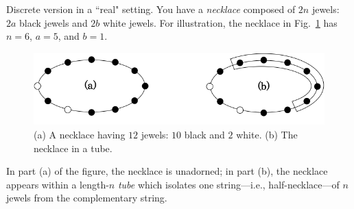 \begin{enumerate}
{\small\sf Discrete version in a ``real" setting}.
You have a {\it necklace} composed of $2n$ jewels: $2a$ black jewels and $2b$ white jewels.  For illustration, the necklace in Fig.~\ref{fig:sample-necklace} has $n = 6$, $a = 5$, and $b =1$.
\begin{figure}[ht]
\begin{center}
       \includegraphics[scale=0.35]{FiguresMaths/SampleNecklace}
\caption{(a) A necklace having $12$ jewels: $10$ black and $2$ white.  (b) The necklace in a tube.}
\label{fig:sample-necklace}
\end{center}
\end{figure}
In part (a) of the figure, the necklace is unadorned; in part (b), the necklace appears within a length-$n$ {\it tube} which isolates one string---i.e., half-necklace---of $n$ jewels from the complementary string.


\end{enumerate}
